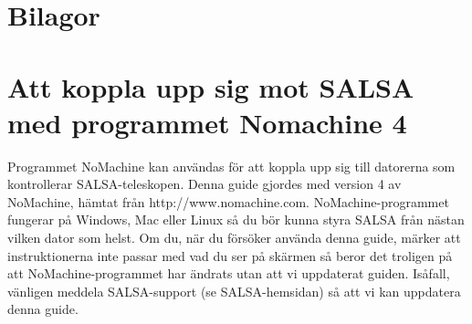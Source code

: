 \chapter*{Bilagor}
\appendix

\chapter{Att koppla upp sig mot SALSA med programmet Nomachine 4}
\label{app:nomachine}
Programmet NoMachine kan användas för att koppla upp sig till datorerna som
kontrollerar SALSA-teleskopen. Denna guide gjordes med version 4 av NoMachine,
hämtat från http://www.nomachine.com. NoMachine-programmet fungerar på Windows,
Mac eller Linux så du bör kunna styra SALSA från nästan vilken dator som helst. 
Om du, när du försöker använda denna guide, märker att instruktionerna inte passar
med vad du ser på skärmen så beror det troligen på att NoMachine-programmet har 
ändrats utan att vi uppdaterat guiden. Isåfall, vänligen meddela SALSA-support 
(se SALSA-hemsidan) så att vi kan uppdatera denna guide.

